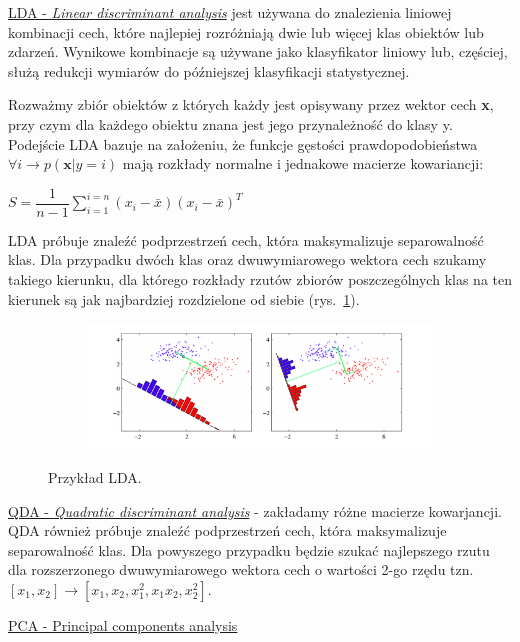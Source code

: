\underline{LDA - \textit{Linear discriminant analysis}} jest używana do znalezienia liniowej kombinacji cech, które najlepiej rozróżniają dwie lub więcej klas obiektów lub zdarzeń. Wynikowe kombinacje są używane jako klasyfikator liniowy lub, częściej, służą redukcji wymiarów do późniejszej klasyfikacji statystycznej. 

Rozważmy zbiór obiektów z których każdy jest opisywany przez wektor cech \textbf{x}, przy czym dla każdego obiektu znana jest jego przynależność do klasy y. Podejście LDA bazuje na założeniu, że funkcje gęstości prawdopodobieństwa $ \forall i \rightarrow p(\textbf{x}|y = i) $ mają rozkłady normalne i jednakowe macierze kowariancji:

$ S = \dfrac{1}{n-1} \sum\limits_{i=1}^{i=n}(x_i - \bar{x})(x_i - \bar{x})^{T} $

LDA próbuje znaleźć podprzestrzeń cech, która maksymalizuje separowalność klas. Dla przypadku dwóch klas oraz dwuwymiarowego wektora cech szukamy takiego kierunku, dla którego rozkłady rzutów zbiorów poszczególnych klas na ten kierunek są jak najbardziej rozdzielone od siebie (rys.~\ref{lda}).

\begin{figure} [H]
	\centering
	\begin{subfigure}{.99\textwidth}
		\centering
		\includegraphics[width=1.0\linewidth]{EDMIIssues/Figures/lda.png}
	\end{subfigure}
	\caption{Przykład LDA.}
	\label{lda}
\end{figure}

\underline{QDA - \textit{Quadratic discriminant analysis}} - zakładamy różne macierze kowarjancji. QDA również próbuje znaleźć podprzestrzeń cech, która maksymalizuje separowalność klas. Dla powyszego przypadku będzie szukać najlepszego rzutu dla rozszerzonego dwuwymiarowego wektora cech o wartości 2-go rzędu tzn. $ [x_1, x_2] \rightarrow [x_1, x_2, x_1^2, x_1x_2, x_2^2] $.

\underline{PCA - Principal components analysis}

